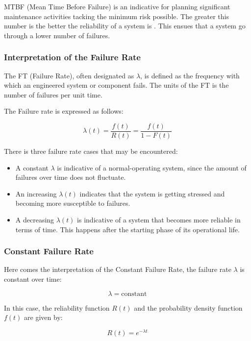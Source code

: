 {	
	
	MTBF (Mean Time Before Failure) is an indicative for planning significant maintenance activities tacking the minimum risk possible. The greater this number is the better the reliability of a system is \cite{Martz2001}. This ensues that a system go through a lower number of failures.
	
	
	\subsubsection{Interpretation of the Failure Rate}
	\indent	
	
	The FT (Failure Rate), often designated as \(\lambda\), is defined as the frequency with which an engineered system or component fails. The units of the FT is the number of failures per unit time.
	
	The Failure rate is expressed as follows: 
	
	\[
	\lambda(t) = \frac{f(t)}{R(t)} = \frac{f(t)}{1 - F(t)}
	\]
	
	There is three failure rate cases that may be encountered: 
	
	\begin{itemize}
		\item A constant \( \lambda \) is indicative of a normal-operating system, since the amount of failures over time does not fluctuate.

		\item An increasing \( \lambda(t) \) indicates that the system is getting stressed and becoming more susceptible to failures.
		
		\item A decreasing \( \lambda(t) \) is indicative of a system that becomes more reliable in terms of time. This happens after the starting phase of its operational life.

	\end{itemize}
	
	
	\subsubsection{Constant Failure Rate}
	Here comes the interpretation of the Constant Failure Rate, the failure rate \( \lambda \) is constant over time:
	
	\[
	\lambda = \text{constant}
	\]
	
	In this case, the reliability function \( R(t) \) and the probability density function \( f(t) \) are given by:
	
	\[
	R(t) = e^{-\lambda t}
	\]
	
}
